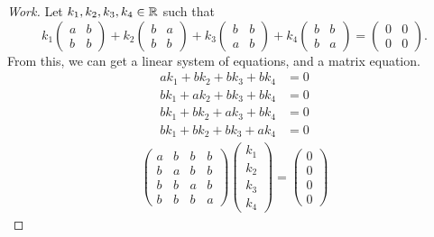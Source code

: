 \documentclass{article}
\begin{document}
\begin{proof}[Work]
    Let $k_1,k_2,k_3,k_4 \in \mathbb{R}$ such that
    \[
        k_1\begin{pmatrix}
            a & b \\
            b & b
        \end{pmatrix} + k_2 \begin{pmatrix}
            b & a \\
            b & b
        \end{pmatrix} + k_3 \begin{pmatrix}
            b & b \\
            a & b
        \end{pmatrix} + k_4\begin{pmatrix}
            b & b \\
            b & a
        \end{pmatrix} = \begin{pmatrix}
            0 & 0 \\
            0 & 0
        \end{pmatrix}.
    \]
    From this, we can get a linear system of equations, and a matrix equation.
    \begin{align*}
        ak_1 + bk_2 + bk_3 + bk_4 & = 0 \\
        bk_1 + ak_2 + bk_3 + bk_4 & = 0 \\
        bk_1 + bk_2 + ak_3 + bk_4 & = 0 \\
        bk_1 + bk_2 + bk_3 + ak_4 & = 0
    \end{align*}
    \begin{align*}
        \begin{pmatrix}
            a & b & b & b \\
            b & a & b & b \\
            b & b & a & b \\
            b & b & b & a
        \end{pmatrix}
        \begin{pmatrix}
            k_1 \\ k_2 \\ k_3 \\ k_4
        \end{pmatrix} =
        \begin{pmatrix}
            0 \\ 0 \\ 0 \\ 0
        \end{pmatrix}
    \end{align*}

\end{proof}
\end{document}

